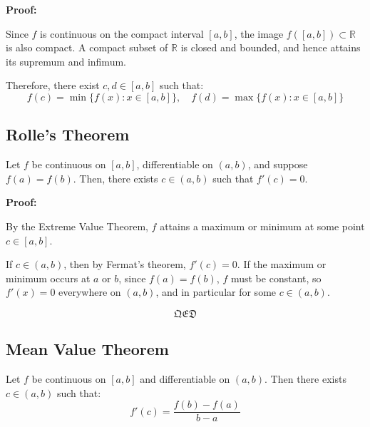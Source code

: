 \textbf{Proof:}  

Since \( f \) is continuous on the compact interval \([a, b]\), the image \( f([a, b]) \subset \mathbb{R} \) 
is also compact. A compact subset of \( \mathbb{R} \) is closed and bounded, and hence 
attains its supremum and infimum.

Therefore, there exist \( c, d \in [a, b] \) such that:
\[
f(c) = \min\{f(x): x \in [a, b]\}, \quad
f(d) = \max\{f(x): x \in [a, b]\}
\]

\QED

\subsection{Rolle’s Theorem}
Let \( f \) be continuous on \([a, b] \), differentiable on \((a, b) \), and suppose \( f(a) = f(b) \).  
Then, there exists \( c \in (a, b) \) such that \( f'(c) = 0 \).

\textbf{Proof:}  

By the Extreme Value Theorem, \( f \) attains a maximum or minimum at some point \( c \in [a, b] \).

If \( c \in (a, b) \), then by Fermat’s theorem, \( f'(c) = 0 \).  
If the maximum or minimum occurs at \( a \) or \( b \), since \( f(a) = f(b) \), \( f \) must be constant, so \( f'(x) = 0 \) everywhere on \((a, b)\), and in particular for some \( c \in (a, b) \).

\[\mathfrak{QED}\]

\begin{center}
\end{center}



\subsection{Mean Value Theorem}

Let \( f \) be continuous on \([a, b] \) and differentiable on \((a, b) \).  
Then there exists \( c \in (a, b) \) such that:
\[
f'(c) = \frac{f(b) - f(a)}{b - a}
\]

